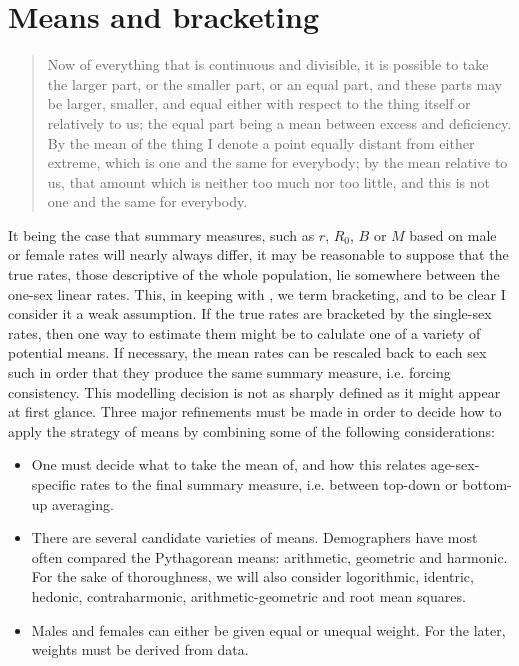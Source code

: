 \section{Means and bracketing}

\begin{singlespace}
\begin{quote}
Now of everything that is continuous and divisible, it is possible to take the larger part, or the smaller part, or an equal part, and these parts may be larger, smaller, and equal either with respect to the thing itself or relatively to us; the equal part being a mean between excess and deficiency. By the mean of the thing I denote a point equally distant from either extreme, which is one and the same for everybody; by the mean relative to us, that amount which is neither too much nor too little, and this is not one and the same for everybody.
\end{quote}
\end{singlespace}


It being the case that summary measures, such as $r$, $R_0$, $B$ or $M$ based on male or female rates will nearly always differ, it may be reasonable to suppose that the true rates, those descriptive of the whole population, lie somewhere between the one-sex linear rates. This, in keeping with \citet{yellin1977comparison}, we term bracketing, and to be clear I consider it a weak assumption. If the true rates are bracketed by the single-sex rates, then one way to estimate them might be to calulate one of a variety of potential means. If necessary, the mean rates can be rescaled back to each sex such in order that they produce the same summary measure, i.e. forcing consistency. This modelling decision is not as sharply defined as it might appear at first glance. Three major refinements must be made in order to decide how to apply the strategy of means by combining some of the following considerations:

\begin{itemize}
\item One must decide what to take the mean of, and how this relates age-sex-specific rates to the final summary measure, i.e. between top-down or bottom-up averaging.
\item There are several candidate varieties of means. Demographers have most often compared the Pythagorean means: arithmetic, geometric and harmonic. For the sake of thoroughness, we will also consider logorithmic, identric, hedonic, contraharmonic, arithmetic-geometric and root mean squares.
\item Males and females can either be given equal or unequal weight. For the later, weights must be derived from data.
\end{itemize}


